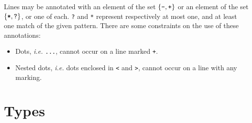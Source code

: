 \documentclass{article}
\newcommand{\mtt}[1]{\mbox{\tt{{#1}}}}
\begin{document}
\begin{grammar}

\end{grammar}

\noindent
Lines may be annotated with an element of the set $\{\mtt{-},
\mtt{+}\}$ or an element of the set $\{\mtt{*}, \mtt{?}\}$, or one of
each. \mtt{?} and \mtt{*} represent respectively at most one, and at
least one match of the given pattern.  There are some constraints on
the use of these annotations:
\begin{itemize}
\item Dots, {\em i.e.} \texttt{...}, cannot occur on a line marked
  \texttt{+}.
\item Nested dots, {\em i.e.} dots enclosed in {\tt <} and {\tt >}, cannot
  occur on a line with any marking.
\end{itemize}


\section{Types}
\label{types}
\end{document}
